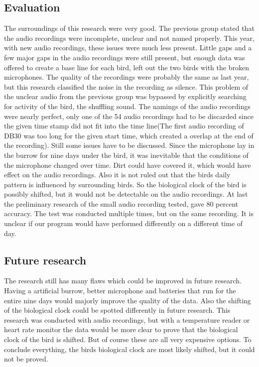 \documentclass[a4paper]{article}
\begin{document}
    \subsection*{Evaluation}
        The surroundings of this research were very good. The previous group stated that the audio recordings were incomplete, unclear and not named properly. This year, with new audio recordings, these issues were much less present. Little gaps and a few major gaps in the audio recordings were still present, but enough data was offered to create a base line for each bird, left out the two birds with the broken microphones. The quality of the recordings were probably the same as last year, but this research classified the noise in the recording as silence. This problem of the unclear audio from the previous group was bypassed by explicitly searching for activity of the bird, the shuffling sound. The namings of the audio recordings were nearly perfect, only one of the 54 audio recordings had to be discarded since the given time stamp did not fit into the time line(The first audio recording of DB30 was too long for the given start time, which created a overlap at the end of the recording). Still some issues have to be discussed. Since the microphone lay in the burrow for nine days under the bird, it was inevitable that the conditions of the microphone changed over time. Dirt could have covered it, which would have effect on the audio recordings. Also it is not ruled out that the birds daily pattern is influenced by surrounding birds. So the biological clock of the bird is possibly shifted, but it would not be detectable on the audio recordings. At last the preliminary research of the small audio recording tested, gave 80 percent accuracy. The test was conducted multiple times, but on the same recording. It is unclear if our program would have performed differently on a different time of day.
    \subsection*{Future research}
        The research still has many flaws which could be improved in future research. Having a artificial burrow, better microphone and batteries that run for the entire nine days would majorly improve the quality of the data. Also the shifting of the biological clock could be spotted differently in future research. This research was conducted with audio recordings, but with a temperature reader or heart rate monitor the data would be more clear to prove that the biological clock of the bird is shifted. But of course these are all very expensive options. To conclude everything, the birds biological clock are most likely shifted, but it could not be proved.
\end{document}
